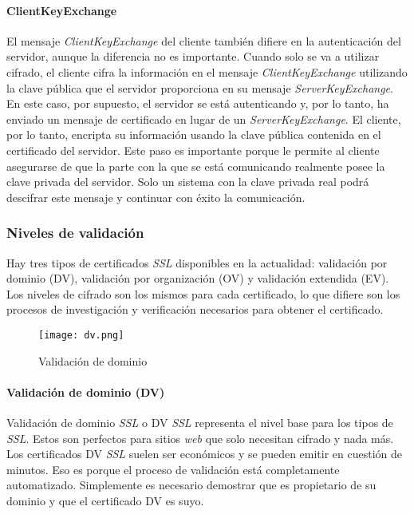 \paragraph*{ClientKeyExchange}
El mensaje \emph{ClientKeyExchange} del cliente también difiere en la autenticación 
del servidor, aunque la diferencia no es importante. Cuando solo se va a 
utilizar cifrado, el cliente cifra la información en el mensaje 
\emph{ClientKeyExchange}
utilizando la clave pública que el servidor proporciona en su mensaje 
\emph{ServerKeyExchange}. En este caso, por supuesto, el servidor se está 
autenticando y, por lo tanto, ha enviado un mensaje de certificado en 
lugar de un \emph{ServerKeyExchange}. El cliente, por lo tanto, encripta su 
información usando la clave pública contenida en el 
certificado del servidor. Este paso es importante porque le permite 
al cliente asegurarse de que la parte con la que se está comunicando 
realmente posee la clave privada del servidor. Solo un sistema con la 
clave privada real podrá descifrar este mensaje y continuar con éxito 
la comunicación.

 

\subsubsection*{Niveles de validación}  
Hay tres tipos de certificados \emph{SSL} disponibles en la actualidad: validación por 
dominio (DV),
validación por organización (OV) y validación extendida (EV).
Los niveles de cifrado son los mismos para cada certificado, lo que difiere son los 
procesos de investigación y verificación necesarios para obtener el certificado.

\begin{center}
   \begin{figure}   
      \begin{center}
         \texttt{[image: dv.png]}
      \end{center}
      \caption{Validación de dominio}
   \end{figure}
\end{center}

\paragraph*{Validación de dominio (DV)}
Validación de dominio \emph{SSL} o DV \emph{SSL} representa el nivel base para los tipos de \emph{SSL}. 
Estos son perfectos para sitios \emph{web} que solo necesitan cifrado y nada más. Los 
certificados DV \emph{SSL} suelen ser económicos y se pueden emitir en cuestión de minutos. 
Eso es porque el proceso de validación está completamente automatizado. Simplemente 
es necesario demostrar que es propietario de su dominio y que el certificado DV 
es suyo. 



